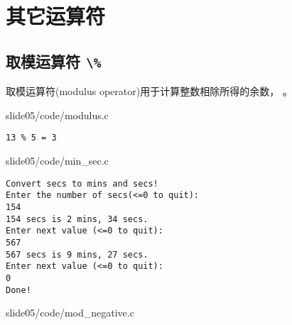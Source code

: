 \section{其它运算符}

\subsection{取模运算符  \lstinline|\%|}
\begin{frame}[fragile]
  取模运算符(modulus operator)用于计算整数相除所得的余数，
  。

\end{frame}

\begin{frame}[fragile]
  
  {slide05/code/modulus.c}

\begin{lstlisting}[backgroundcolor=\color{red!10}]
13 % 5 = 3
\end{lstlisting}
\end{frame}

\begin{frame}
  
  {slide05/code/min_sec.c}
\end{frame}


\begin{frame}[fragile]
\begin{lstlisting}[backgroundcolor=\color{red!10}]
Convert secs to mins and secs!
Enter the number of secs(<=0 to quit):
154
154 secs is 2 mins, 34 secs.
Enter next value (<=0 to quit):
567
567 secs is 9 mins, 27 secs.
Enter next value (<=0 to quit):
0
Done!
\end{lstlisting}
\end{frame}

\begin{frame}
  
  {slide05/code/mod_negative.c}

\end{frame}

